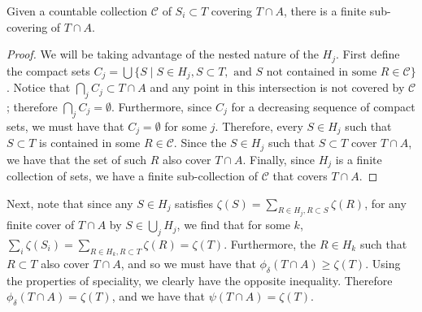 \begin{lemma}
Given a countable collection \(\mathcal C\) of \(S_i \subset T\) covering \(T \cap A\), there is a
finite sub-covering of
\(T \cap A\).
\end{lemma}
\begin{proof}
We will be taking advantage of the nested nature of the \(H_j\). First define the compact sets
\(C_j = \bigcup \{S \mid S \in H_j, S \subset T, \text{ and } S \text{ not contained in some } R\in\mathcal C\}\).
Notice that 
\(\bigcap_j C_j \subset T \cap A\) and any point in this intersection is not covered by \(\mathcal C\);
therefore \(\bigcap_j C_j = \emptyset\). Furthermore, since \(C_j\) for a decreasing sequence of compact sets,
we must have that \(C_j = \emptyset\) for some \(j\). Therefore, every \(S\in H_j\) such that \(S\subset T\) is
contained in some \(R\in\mathcal C\). Since the \(S \in H_j\) such that \(S\subset T\) cover \(T\cap A\), we have
that the set of such \(R\) also cover \(T\cap A\). Finally, since \(H_j\) is a finite collection of sets, we have
a finite sub-collection of \(\mathcal C\) that covers \(T \cap A\). 
\end{proof}

Next, note that since any \(S \in H_j\) satisfies \(\zeta(S) = \sum\limits_{R\in H_j, R \subset S} \zeta(R)\), for
any finite cover of \(T\cap A\) by \(S \in \bigcup_j H_j\), we find that for some \(k\),
\(\sum_i\zeta(S_i) = \sum\limits_{R \in H_k, R\subset T} \zeta(R) = \zeta(T)\). Furthermore, the \(R\in H_k\)
such that \(R \subset T\) also cover \(T \cap A\), and so we must have that \(\phi_\delta(T\cap A) \geq \zeta(T)\). 
Using the properties of speciality, we clearly have the opposite 
inequality. Therefore \(\phi_\delta(T\cap A) = \zeta(T)\), and we have that \(\psi(T\cap A) = \zeta(T)\).
